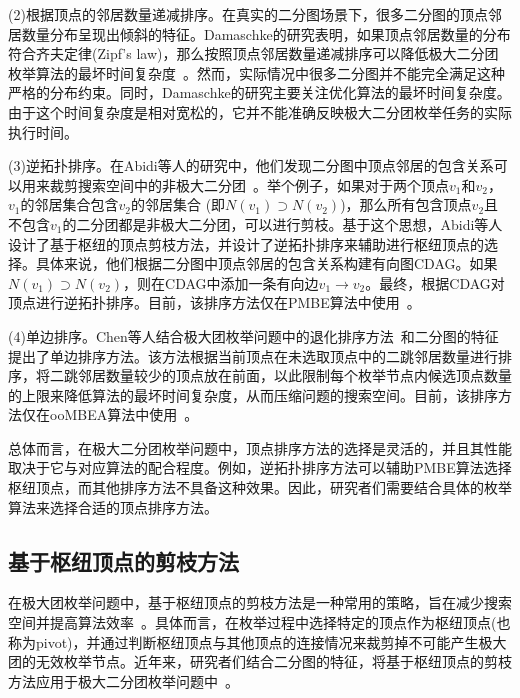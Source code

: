 (2)根据顶点的邻居数量递减排序。在真实的二分图场景下，很多二分图的顶点邻居数量分布呈现出倾斜的特征。Damaschke的研究表明，如果顶点邻居数量的分布符合齐夫定律(Zipf's law)，那么按照顶点邻居数量递减排序可以降低极大二分团枚举算法的最坏时间复杂度~\cite{Damaschke14}。然而，实际情况中很多二分图并不能完全满足这种严格的分布约束。同时，Damaschke的研究主要关注优化算法的最坏时间复杂度。由于这个时间复杂度是相对宽松的，它并不能准确反映极大二分团枚举任务的实际执行时间。

(3)逆拓扑排序。在Abidi等人的研究中，他们发现二分图中顶点邻居的包含关系可以用来裁剪搜索空间中的非极大二分团~\cite{PMBE20}。举个例子，如果对于两个顶点$v_1$和$v_2$，$v_1$的邻居集合包含$v_2$的邻居集合 (即$N(v_1)\supset N(v_2)$)，那么所有包含顶点$v_2$且不包含$v_1$的二分团都是非极大二分团，可以进行剪枝。基于这个思想，Abidi等人设计了基于枢纽的顶点剪枝方法，并设计了逆拓扑排序来辅助进行枢纽顶点的选择。具体来说，他们根据二分图中顶点邻居的包含关系构建有向图CDAG。如果$N(v_1)\supset N(v_2)$，则在CDAG中添加一条有向边$v_1\rightarrow v_2$。最终，根据CDAG对顶点进行逆拓扑排序。目前，该排序方法仅在PMBE算法中使用~\cite{PMBE20}。

(4)单边排序。Chen等人结合极大团枚举问题中的退化排序方法~\cite{MCEdegeneracy10}和二分图的特征提出了单边排序方法。该方法根据当前顶点在未选取顶点中的二跳邻居数量进行排序，将二跳邻居数量较少的顶点放在前面，以此限制每个枚举节点内候选顶点数量的上限来降低算法的最坏时间复杂度，从而压缩问题的搜索空间。目前，该排序方法仅在ooMBEA算法中使用~\cite{ooMBE22}。

总体而言，在极大二分团枚举问题中，顶点排序方法的选择是灵活的，并且其性能取决于它与对应算法的配合程度。例如，逆拓扑排序方法可以辅助PMBE算法选择枢纽顶点，而其他排序方法不具备这种效果。因此，研究者们需要结合具体的枚举算法来选择合适的顶点排序方法。

\subsection{基于枢纽顶点的剪枝方法}
\label{subsec:pivot}

在极大团枚举问题中，基于枢纽顶点的剪枝方法是一种常用的策略，旨在减少搜索空间并提高算法效率~\cite{MCEdegeneracy10}。具体而言，在枚举过程中选择特定的顶点作为枢纽顶点(也称为pivot)，并通过判断枢纽顶点与其他顶点的连接情况来裁剪掉不可能产生极大团的无效枚举节点。近年来，研究者们结合二分图的特征，将基于枢纽顶点的剪枝方法应用于极大二分团枚举问题中~\cite{PMBE20,ooMBE22}。

